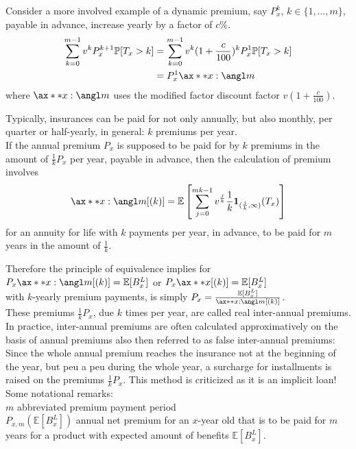 \documentclass[11pt,a4paper,twoside]{article}
\begin{document}
Consider a more involved example of a dynamic premium, say \( P_x^k \), \( k \in \{1, \dots, m\} \), payable in advance, 
increase yearly by a factor of \( c \% \). \\
\begin{align*}
  \sum_{k=0}^{m-1} v^k P_x^{k+1} \mathbb{P}[T_x > k] &= \sum_{k=0}^{m-1} v^k (1 + \frac{c}{100})^k P^1_x \mathbb{P}[T_x > k]  \\
  &= P^1_x \ax**{x:\angl m}
\end{align*}
where \( \ax**{x:\angl m} \) uses the modified factor discount factor \( v(1 + \frac{c}{100}) \).

Typically, insurances can be paid for not only annually, but also monthly, 
per quarter or half-yearly, in general: \( k \) premiums per year. \\
If the annual premium \( P_x \) is supposed to be paid for by \( k \) premiums in the amount of \( \frac{1}{k}P_x \)
per year, payable in advance, then the calculation of premium involves 
\[ \ax**{x:\angl m}[(k)] = \mathbb{E}\left[\sum^{mk - 1}_{j=0} v^{\frac{j}{k}} \frac{1}{k} \mathbf{1}_{(\frac{j}{k}, \infty)}(T_x) \right] \]
for an annuity for life with \( k \) payments per year, in advance, to be paid for \( m \) years in the
amount of \( \frac{1}{k} \).

Therefore the principle of equivalence implies for \\
\( P_x \ax**{x:\angl m}[(k)] = \mathbb{E}[B^L_x] \) or \( P_x \ax**{x}[(k)] = \mathbb{E}[B^L_x] \) \\
with \( k \)-yearly premium payments, is simply 
\( P_x = \frac{\mathbb{E}[B^L_x]}{\ax**{x:\angl m}[(k)]} \). \\
These premiums \( \frac{1}{k}P_x \), due \( k \) times per year, are called real inter-annual premiums. \\
In practice, inter-annual premiums are often calculated 
approximatively on the basis of annual premiums also then referred to as false inter-annual premiums: \\
Since the whole annual premium reaches the insurance not at the beginning of the year,
but peu a peu during the whole year, a surcharge for installments is raised on the
premiums \( \frac{1}{k}P_x \). This method is criticized as it is an implicit loan! \\

Some notational remarks: \\
\( m \) abbreviated premium payment period \\
\( P_{x,m}(\mathbb{E}[B^L_x]) \) annual net premium for an \( x \)-year old that is to be paid
for \( m \) years for a product with expected amount
of benefits \( \mathbb{E}[B_x^L] \).
\end{document}
